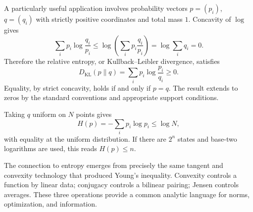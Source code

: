 A particularly useful application involves probability vectors \(p=(p_i)\), \(q=(q_i)\) with strictly positive coordinates and total mass \(1\). Concavity of \(\log\) gives
\[
 \sum_i p_i\log\frac{q_i}{p_i}
 \le\log\left(\sum_i p_i\frac{q_i}{p_i}\right)
 =\log\sum_iq_i=0.
\]
Therefore the relative entropy, or Kullback--Leibler divergence, satisfies
\[
 \boxed{D_{\mathrm{KL}}(p\|q)
       =\sum_i p_i\log\frac{p_i}{q_i}\ge0.}
\]
Equality, by strict concavity, holds if and only if \(p=q\). The result extends to zeros by the standard conventions and appropriate support conditions.

Taking \(q\) uniform on \(N\) points gives
\[
 H(p)=-\sum_i p_i\log p_i\le\log N,
\]
with equality at the uniform distribution. If there are \(2^n\) states and base-two logarithms are used, this reads \(H(p)\le n\).

The connection to entropy emerges from precisely the same tangent and convexity technology that produced Young's inequality. Convexity controls a function by linear data; conjugacy controls a bilinear pairing; Jensen controls averages. These three operations provide a common analytic language for norms, optimization, and information.
